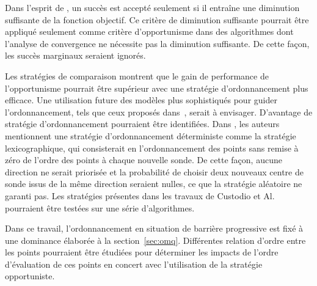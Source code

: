 Dans l'esprit de \GSS, un succès est accepté seulement si il entraîne une diminution suffisante de la fonction objectif. Ce critère de diminution suffisante pourrait être appliqué seulement comme critère d'opportunisme dans des algorithmes dont l'analyse de convergence ne nécessite pas la diminution suffisante. De cette façon, les succès marginaux seraient ignorés.

Les stratégies de comparaison montrent que le gain de performance de l'opportunisme pourrait être supérieur avec une stratégie d'ordonnancement plus efficace. Une utilisation future des modèles plus sophistiqués pour guider l'ordonnancement, tels que ceux proposés dans~\cite{AuKoLedTa2016}, serait à envisager. D'avantage de stratégie d'ordonnancement pourraient être identifiées. Dans \cite{CoScVibook}, les auteurs mentionnent une stratégie d'ordonnancement déterministe comme la stratégie lexicographique, qui consisterait en l'ordonnancement des points sans remise à zéro de l'ordre des points à chaque nouvelle sonde. De cette façon, aucune direction ne serait priorisée et la probabilité de choisir deux nouveaux centre de sonde issus de la même direction seraient nulles, ce que la stratégie aléatoire ne garanti pas. Les stratégies présentes dans les travaux de Custodio et Al.~\cite{CuDeVi08} pourraient être testées sur une série d'algorithmes.

Dans ce travail, l'ordonnancement en situation de barrière progressive est fixé à une dominance élaborée à la section~\ref{sec:omq}. Différentes relation d'ordre entre les points pourraient être étudiées pour déterminer les impacts de l'ordre d'évaluation de ces points en concert avec l'utilisation de la stratégie opportuniste.